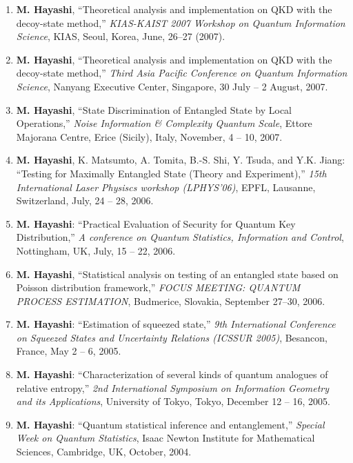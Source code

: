 \documentclass[a4paper,12pt,oneside]{article}
\begin{document}
\begin{enumerate}
\item
\textbf{M. Hayashi}, ``Theoretical analysis and implementation on QKD with the decoy-state method,'' 
{\em KIAS-KAIST 2007 Workshop on Quantum Information Science}, KIAS, Seoul, Korea, June, 26--27 (2007).

\item
\textbf{M. Hayashi}, ``Theoretical analysis and implementation on QKD with the decoy-state method,'' 
{\em Third Asia Pacific Conference on Quantum Information Science}, 
Nanyang Executive Center, Singapore, 
30 July -- 2 August, 2007.

\item
\textbf{M. Hayashi}, ``State Discrimination of Entangled State by Local Operations,'' 
{\em Noise Information \& Complexity \@ Quantum Scale}, Ettore Majorana Centre, Erice (Sicily), Italy, November, 4 -- 10, 2007.


\item
\textbf{M. Hayashi}, K. Matsumto, A. Tomita, B.-S. Shi, Y. Tsuda, and Y.K. Jiang: ``Testing for Maximally Entangled State (Theory and Experiment),'' 
{\em 15th International Laser Physiscs workshop (LPHYS'06)}, EPFL, Lausanne, Switzerland, 
July, 24 -- 28, 2006.

\item
\textbf{M. Hayashi}: ``Practical Evaluation of Security for Quantum Key Distribution,'' 
{\em A conference on Quantum Statistics, Information and Control}, Nottingham, UK, July, 15 -- 22, 2006.

\item
\textbf{M. Hayashi}, ``Statistical analysis on testing of an entangled state based on Poisson distribution framework,'' 
{\em FOCUS MEETING: QUANTUM PROCESS ESTIMATION}, 
Budmerice, Slovakia, September 27--30, 2006.

\item
\textbf{M. Hayashi}: ``Estimation of squeezed state,'' 
{\em 9th International Conference on Squeezed States and Uncertainty Relations (ICSSUR 2005)}, Besancon, France, May 2 -- 6,  2005.

\item
\textbf{M. Hayashi}: ``Characterization of several kinds of quantum analogues of relative entropy,'' 
{\em 2nd International Symposium on Information Geometry and its Applications}, 
University of Tokyo, Tokyo, December 12 -- 16,  2005.

\item
\textbf{M. Hayashi}: ``Quantum statistical inference and entanglement,'' 
{\em Special Week on Quantum Statistics}, Isaac Newton Institute for Mathematical Sciences, Cambridge, UK, October, 2004.


\end{enumerate}
\end{document}

